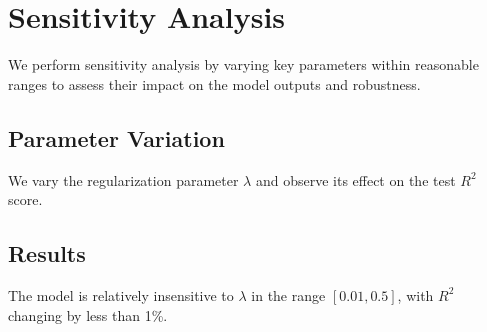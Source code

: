 \section{Sensitivity Analysis}

We perform sensitivity analysis by varying key parameters within reasonable ranges to assess their impact on the model outputs and robustness.

\subsection{Parameter Variation}
We vary the regularization parameter $\lambda$ and observe its effect on the test $R^2$ score.

\subsection{Results}
The model is relatively insensitive to $\lambda$ in the range $[0.01, 0.5]$, with $R^2$ changing by less than 1\%.
